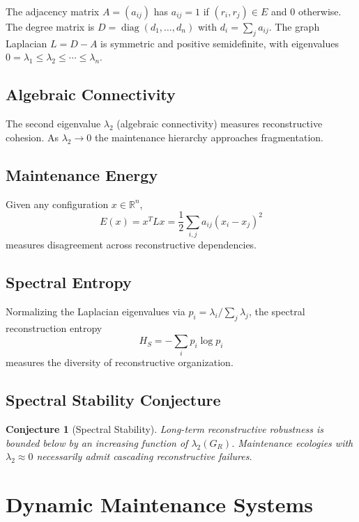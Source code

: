 \documentclass[12pt,oneside]{article}
\theoremstyle{plain}
\theoremstyle{definition}
\theoremstyle{remark}
\theoremstyle{plain}
\newtheorem{conjecture}[theorem]{Conjecture}
\begin{document}
The adjacency matrix $A = (a_{ij})$ has $a_{ij} = 1$ if $(r_i, r_j) \in E$ and $0$ otherwise.
The degree matrix is $D = \operatorname{diag}(d_1, \ldots, d_n)$ with $d_i = \sum_j a_{ij}$. The
graph Laplacian $L = D - A$ is symmetric and positive semidefinite, with eigenvalues
$0 = \lambda_1 \le \lambda_2 \le \cdots \le \lambda_n$.

\subsection{Algebraic Connectivity}

The second eigenvalue $\lambda_2$ (algebraic connectivity) measures reconstructive cohesion. As
$\lambda_2 \rightarrow 0$ the maintenance hierarchy approaches fragmentation.

\subsection{Maintenance Energy}

Given any configuration $x \in \mathbb{R}^n$,
\[
E(x) = x^T L x = \frac{1}{2} \sum_{i,j} a_{ij}(x_i - x_j)^2
\]
measures disagreement across reconstructive dependencies.

\subsection{Spectral Entropy}

Normalizing the Laplacian eigenvalues via $p_i = \lambda_i / \sum_j \lambda_j$, the spectral
reconstruction entropy
\[
H_S = -\sum_i p_i \log p_i
\]
measures the diversity of reconstructive organization.

\subsection{Spectral Stability Conjecture}

\begin{conjecture}[Spectral Stability]
Long-term reconstructive robustness is bounded below by an increasing function of
$\lambda_2(G_R)$. Maintenance ecologies with $\lambda_2 \approx 0$ necessarily admit cascading
reconstructive failures.
\end{conjecture}

\section{Dynamic Maintenance Systems}
\end{document}

